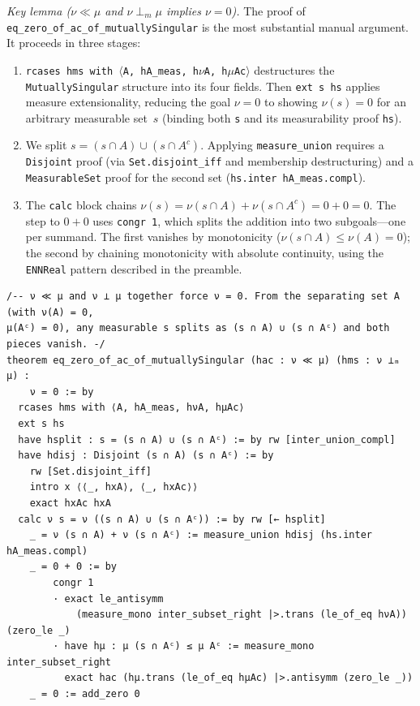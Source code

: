 \documentclass[11pt]{article}
\begin{document}
\smallskip
\noindent
\emph{Key lemma ($\nu \ll \mu$ and $\nu \perp_m \mu$ implies $\nu = 0$).}
The proof of \verb|eq_zero_of_ac_of_mutuallySingular| is the most substantial manual argument. It proceeds in three stages:
\begin{enumerate}
\item \texttt{rcases hms with $\langle$A, hA\_meas, h$\nu$A, h$\mu$Ac$\rangle$} destructures the \texttt{MutuallySingular} structure into its four fields. Then \texttt{ext~s~hs} applies measure extensionality, reducing the goal $\nu = 0$ to showing $\nu(s) = 0$ for an arbitrary measurable set~$s$ (binding both \texttt{s} and its measurability proof \texttt{hs}).

\item We split $s = (s \cap A) \cup (s \cap A^c)$. Applying \texttt{measure\_union} requires a \texttt{Disjoint} proof (via \texttt{Set.disjoint\_iff} and membership destructuring) and a \texttt{MeasurableSet} proof for the second set (\texttt{hs.inter hA\_meas.compl}).

\item The \texttt{calc} block chains $\nu(s) = \nu(s \cap A) + \nu(s \cap A^c) = 0 + 0 = 0$. The step to $0 + 0$ uses \texttt{congr~1}, which splits the addition into two subgoals---one per summand. The first vanishes by monotonicity ($\nu(s \cap A) \le \nu(A) = 0$); the second by chaining monotonicity with absolute continuity, using the \texttt{ENNReal} pattern described in the preamble.
\end{enumerate}

\begin{verbatim}
/-- ν ≪ μ and ν ⟂ μ together force ν = 0. From the separating set A (with ν(A) = 0,
μ(Aᶜ) = 0), any measurable s splits as (s ∩ A) ∪ (s ∩ Aᶜ) and both pieces vanish. -/
theorem eq_zero_of_ac_of_mutuallySingular (hac : ν ≪ μ) (hms : ν ⟂ₘ μ) :
    ν = 0 := by
  rcases hms with ⟨A, hA_meas, hνA, hμAc⟩
  ext s hs
  have hsplit : s = (s ∩ A) ∪ (s ∩ Aᶜ) := by rw [inter_union_compl]
  have hdisj : Disjoint (s ∩ A) (s ∩ Aᶜ) := by
    rw [Set.disjoint_iff]
    intro x ⟨⟨_, hxA⟩, ⟨_, hxAc⟩⟩
    exact hxAc hxA
  calc ν s = ν ((s ∩ A) ∪ (s ∩ Aᶜ)) := by rw [← hsplit]
    _ = ν (s ∩ A) + ν (s ∩ Aᶜ) := measure_union hdisj (hs.inter hA_meas.compl)
    _ = 0 + 0 := by
        congr 1
        · exact le_antisymm
            (measure_mono inter_subset_right |>.trans (le_of_eq hνA)) (zero_le _)
        · have hμ : μ (s ∩ Aᶜ) ≤ μ Aᶜ := measure_mono inter_subset_right
          exact hac (hμ.trans (le_of_eq hμAc) |>.antisymm (zero_le _))
    _ = 0 := add_zero 0
\end{verbatim}
\end{document}
